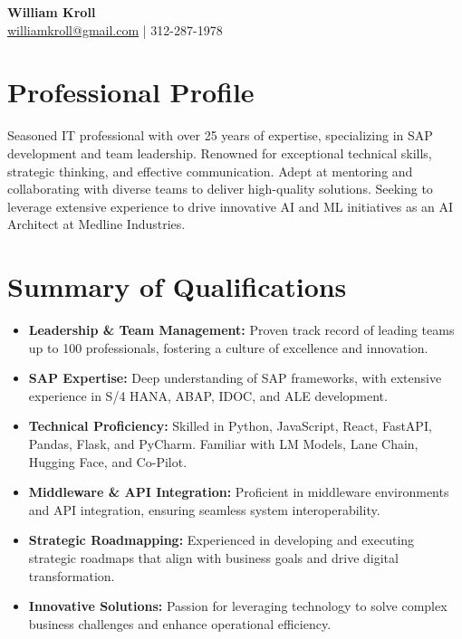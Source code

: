 \documentclass[a4paper,10pt]{article}
\begin{document}
\begin{center}
    \textbf{\huge William Kroll} \\
    \href{mailto:williamkroll@gmail.com}{williamkroll@gmail.com} | 312-287-1978
\end{center}

\section*{Professional Profile}
Seasoned IT professional with over 25 years of expertise, specializing in SAP development and team leadership. Renowned for exceptional technical skills, strategic thinking, and effective communication. Adept at mentoring and collaborating with diverse teams to deliver high-quality solutions. Seeking to leverage extensive experience to drive innovative AI and ML initiatives as an AI Architect at Medline Industries.

\section*{Summary of Qualifications}
\begin{itemize}[leftmargin=*]
    \item \textbf{Leadership \& Team Management:} Proven track record of leading teams up to 100 professionals, fostering a culture of excellence and innovation.
    \item \textbf{SAP Expertise:} Deep understanding of SAP frameworks, with extensive experience in S/4 HANA, ABAP, IDOC, and ALE development.
    \item \textbf{Technical Proficiency:} Skilled in Python, JavaScript, React, FastAPI, Pandas, Flask, and PyCharm. Familiar with LM Models, Lane Chain, Hugging Face, and Co-Pilot.
    \item \textbf{Middleware \& API Integration:} Proficient in middleware environments and API integration, ensuring seamless system interoperability.
    \item \textbf{Strategic Roadmapping:} Experienced in developing and executing strategic roadmaps that align with business goals and drive digital transformation.
    \item \textbf{Innovative Solutions:} Passion for leveraging technology to solve complex business challenges and enhance operational efficiency.
\end{itemize}
\end{document}
